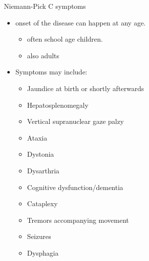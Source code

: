 \documentclass[presentation, smaller]{beamer}
\begin{document}
\begin{frame}[label={sec:orgheadline12}]{Niemann-Pick C symptoms}
\begin{itemize}
\item onset of the disease can happen at any age.
\begin{itemize}
\item often school age children.
\item also adults
\end{itemize}

\item Symptoms may include:
\begin{itemize}
\item Jaundice at birth or shortly afterwards
\item Hepatosplenomegaly
\item Vertical supranuclear gaze palzy
\item Ataxia
\item Dystonia
\item Dysarthria
\item Cognitive dysfunction/dementia
\item Cataplexy
\item Tremors accompanying movement
\item Seizures
\item Dysphagia
\end{itemize}
\end{itemize}
\end{frame}
\end{document}
